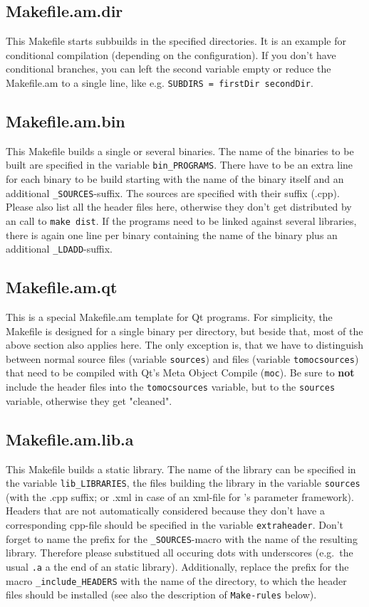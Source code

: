 \subsection{Makefile.am.dir}
This Makefile starts subbuilds in the specified directories. It is an
example for conditional compilation (depending on the
configuration). If you don't have conditional branches, you can left
the second variable empty or reduce the Makefile.am to a single line,
like e.g. \texttt{SUBDIRS = firstDir secondDir}.

\subsection{Makefile.am.bin}
This Makefile builds a single or several binaries. The name of the
binaries to be built are specified in the variable {\tt bin\_PROGRAMS}.
There have to be an extra line for each binary to be build starting
with the name of the binary itself and an additional
\texttt{\_SOURCES}-suffix. The sources are specified with their suffix
(.cpp). Please also list all the header files here, otherwise they
don't get distributed by an call to \texttt{make dist}. If the
programs need to be linked against several libraries, there is again
one line per binary containing the name of the binary plus an
additional \texttt{\_LDADD}-suffix.

\subsection{Makefile.am.qt}
This is a special Makefile.am template for Qt programs. For
simplicity, the Makefile is designed for a single binary per
directory, but beside that, most of the above section also applies
here. The only exception is, that we have to distinguish between
normal source files (variable \texttt{sources}) and files (variable
\texttt{tomocsources}) that need to be compiled with Qt's Meta Object
Compile (\texttt{moc}). Be sure to \textbf{not} include the header
files into the \texttt{tomocsources} variable, but to the
\texttt{sources} variable, otherwise they get "cleaned".

\subsection{Makefile.am.lib.a}
This Makefile builds a static library. The name of the library can be
specified in the variable \texttt{lib\_LIBRARIES}, the files building
the library in the variable \texttt{sources} (with the .cpp suffix; or
.xml in case of an xml-file for \miro's parameter framework). Headers
that are not automatically considered because they don't have a
corresponding cpp-file should be specified in the variable
\texttt{extraheader}. Don't forget to name the prefix for the
\texttt{\_SOURCES}-macro with the name of the resulting library.
Therefore please substitued all occuring dots with underscores (e.g.\ 
the usual \texttt{.a} a the end of an static library).  Additionally,
replace the prefix for the macro \texttt{\_include\_HEADERS} with the
name of the directory, to which the header files should be installed
(see also the description of \texttt{Make-rules} below).


